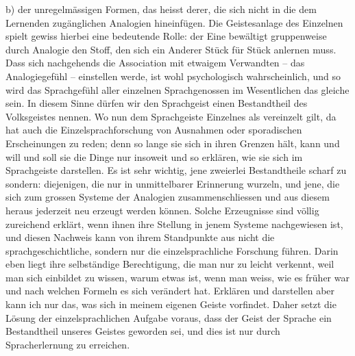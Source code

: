 b) der unregelmässigen Formen, das heisst derer, die sich nicht in die dem Lernenden zugänglichen Analogien hineinfügen. Die Geistesanlage des Einzelnen spielt gewiss hierbei eine bedeutende Rolle: der Eine bewältigt gruppenweise durch Analogie den Stoff, den sich ein Anderer Stück für Stück anlernen muss. Dass sich nachgehends die Association mit etwaigem Verwandten – das Analogiegefühl – einstellen werde, ist wohl psychologisch wahrscheinlich, und so wird das Sprachgefühl aller einzelnen Sprachgenossen im Wesentlichen das gleiche sein. In diesem Sinne dürfen wir den Sprachgeist einen Bestandtheil des Volksgeistes nennen. Wo nun dem Sprachgeiste Einzelnes als vereinzelt gilt, da hat auch die Einzelsprachforschung von Ausnahmen oder sporadischen Erscheinungen zu reden; denn so lange sie sich in ihren Grenzen hält, kann und will und soll sie die Dinge nur insoweit und so erklären, wie sie sich im Sprachgeiste darstellen.  Es ist sehr wichtig, jene zweierlei Bestandtheile scharf zu sondern: diejenigen, die nur in unmittelbarer Erinnerung wurzeln, und jene, die sich zum grossen Systeme der Analogien zusammenschliessen und aus diesem heraus jederzeit neu erzeugt werden können. Solche Erzeugnisse sind völlig zureichend erklärt, wenn ihnen ihre Stellung in jenem Systeme nachgewiesen ist, und diesen Nachweis kann von ihrem Standpunkte aus nicht die sprachgeschichtliche, sondern nur die einzelsprachliche Forschung führen. Darin eben liegt ihre selbständige Berechtigung, die man nur zu leicht verkennt, weil man sich einbildet zu wissen, warum etwas ist, wenn man weiss, wie es früher war und nach welchen Formeln es sich verändert hat. Erklären und darstellen \label{fp.65} aber kann ich nur das, was sich in meinem eigenen Geiste vorfindet. Daher setzt die Lösung der einzelsprachlichen Aufgabe voraus, dass der Geist der Sprache ein Bestandtheil unseres Geistes geworden sei, und dies ist nur durch Spracherlernung zu erreichen. 

